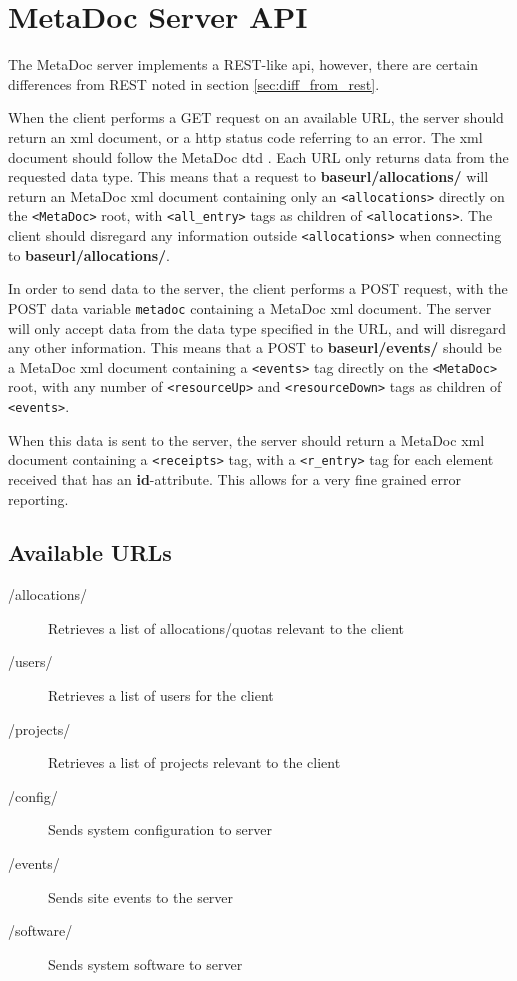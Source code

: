 \newpage
\section{MetaDoc Server API}
\label{sec:server_api}

The MetaDoc server implements a REST-like \gls{api}, however, there are certain
differences from REST noted in section \ref{sec:diff_from_rest}.

When the client performs a GET request on an available URL, the server should
return an \gls{xml} document, or a \gls{http} status code referring to an
error.  The \gls{xml} document should follow the MetaDoc \gls{dtd}
\cite{metadoc_dtd}. Each URL only returns data from the requested data type.
This means that a request to \textbf{baseurl/allocations/} will return an
MetaDoc \gls{xml} document containing only an \texttt{<allocations>} directly
on the \texttt{<MetaDoc>} root, with \texttt{<all\_entry>} tags as children of
\texttt{<allocations>}.  The client should disregard any information outside
\texttt{<allocations>} when connecting to \textbf{baseurl/allocations/}. 

In order to send data to the server, the client performs a POST request, with
the POST data variable \texttt{metadoc} containing a MetaDoc \gls{xml}
document. The server will only accept data from the data type specified in the
URL, and will disregard any other information. This means that a POST to
\textbf{baseurl/events/} should be a MetaDoc \gls{xml} document containing a
\texttt{<events>} tag directly on the \texttt{<MetaDoc>} root, with any number
of \texttt{<resourceUp>} and \texttt{<resourceDown>} tags as children of
\texttt{<events>}. 

When this data is sent to the server, the server should return a MetaDoc
\gls{xml} document containing a \texttt{<receipts>} tag, with a
\texttt{<r\_entry>} tag for each element received that has an
\textbf{id}-attribute. This allows for a very fine grained error reporting.

\subsection{Available URLs}

\begin{description}
    \item[/allocations/] Retrieves a list of allocations/quotas relevant
        to the client
    \item[/users/] Retrieves a list of users for the client
    \item[/projects/] Retrieves a list of projects relevant to the
        client
    \item[/config/] Sends system configuration to server
    \item[/events/] Sends site events to the server
    \item[/software/] Sends system software to server
\end{description}

